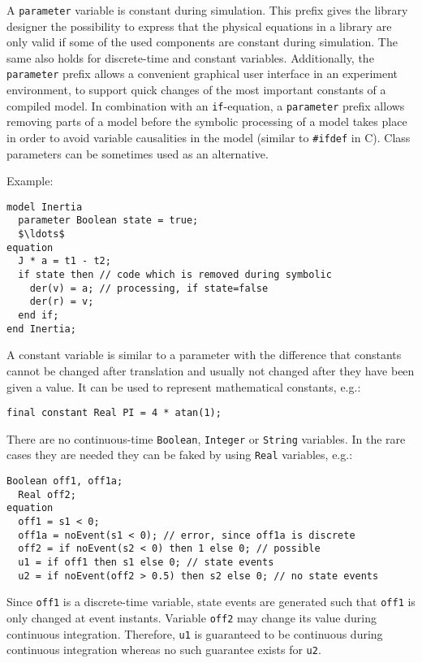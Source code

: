 \begin{nonnormative}
A \lstinline!parameter! variable is constant during simulation.
This prefix gives the library designer the possibility to express that the physical equations in a library are only valid if some of the used components are constant during simulation.
The same also holds for discrete-time and constant variables.
Additionally, the \lstinline!parameter! prefix allows a convenient graphical user interface in an experiment environment, to support quick changes of the most important constants of a compiled model.
In combination with an \lstinline!if!-equation, a \lstinline!parameter! prefix allows removing parts of a model before the symbolic processing of a model takes place in order to avoid variable causalities in the model (similar to \lstinline!#ifdef! in C).
Class parameters can be sometimes used as an alternative.

Example:
\begin{lstlisting}[language=modelica]
model Inertia
  parameter Boolean state = true;
  $\ldots$
equation
  J * a = t1 - t2;
  if state then // code which is removed during symbolic
    der(v) = a; // processing, if state=false
    der(r) = v;
  end if;
end Inertia;
\end{lstlisting}

A constant variable is similar to a parameter with the difference that constants cannot be changed after translation and usually not changed after they have been given a value.
It can be used to represent mathematical constants, e.g.:
\begin{lstlisting}[language=modelica]
final constant Real PI = 4 * atan(1);
\end{lstlisting}

There are no continuous-time \lstinline!Boolean!, \lstinline!Integer! or \lstinline!String! variables.
In the rare cases they are needed they can be faked by using \lstinline!Real! variables, e.g.:
\begin{lstlisting}[language=modelica]
  Boolean off1, off1a;
  Real off2;
equation
  off1 = s1 < 0;
  off1a = noEvent(s1 < 0); // error, since off1a is discrete
  off2 = if noEvent(s2 < 0) then 1 else 0; // possible
  u1 = if off1 then s1 else 0; // state events
  u2 = if noEvent(off2 > 0.5) then s2 else 0; // no state events
\end{lstlisting}

Since \lstinline!off1! is a discrete-time variable, state events are generated such that \lstinline!off1! is only changed at event instants.
Variable \lstinline!off2! may change its value during continuous integration.
Therefore, \lstinline!u1! is guaranteed to be continuous during continuous integration whereas no such guarantee exists for \lstinline!u2!.
\end{nonnormative}


